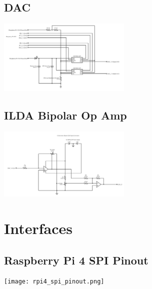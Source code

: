 \documentclass[journal]{IEEEtran}
\begin{document}
    \subsection{DAC}

    \includegraphics[width=2.5in]{../artifacts/docs/circuit_diagrams/dac_circuit.png}

    \subsection{ILDA Bipolar Op Amp}

    \includegraphics[width=2.5in]{../artifacts/docs/circuit_diagrams/ilda_op_amp_circuit.png}

    \section{Interfaces}
    \subsection{Raspberry Pi 4 SPI Pinout}

    \texttt{[image: rpi4\_spi\_pinout.png]}
\end{document}
